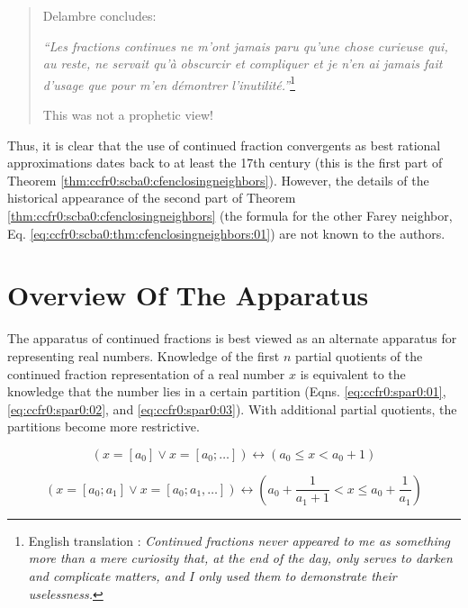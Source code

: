 \begin{quote}
Delambre concludes:

\emph{``Les fractions continues ne m'ont jamais paru qu'une chose
curieuse qui, au reste, ne servait qu'\`a obscurcir et compliquer et je
n'en ai jamais fait d'usage que pour m'en d\'emontrer 
l'inutilit\'e.''}\footnote{English translation 
\cite{bibref:i:sandrinederaspide}:  
\emph{Continued fractions never appeared to me as something more 
than a mere curiosity that, at the end of the day, only serves 
to darken and complicate matters, and I only used them to 
demonstrate their uselessness.}}

This was not a prophetic view!
\end{quote}

Thus, it is clear that the use of continued fraction convergents
as best rational approximations dates back to at least the 
17th century (this is the first part of
Theorem \ref{thm:ccfr0:scba0:cfenclosingneighbors}).  However,
the details of the historical appearance of the second part of
Theorem \ref{thm:ccfr0:scba0:cfenclosingneighbors} (the formula
for the other Farey neighbor, Eq. \ref{eq:ccfr0:scba0:thm:cfenclosingneighbors:01}) 
are not known to the authors.


\section{Overview Of The Apparatus}

The apparatus of continued fractions is best viewed as
an alternate apparatus for representing real numbers.
Knowledge of the first $n$ partial quotients of
the continued fraction representation of a real number
$x$ is equivalent to the knowledge that the number lies
in a certain partition (Eqns.  
\ref{eq:ccfr0:spar0:01},
\ref{eq:ccfr0:spar0:02}, and \ref{eq:ccfr0:spar0:03}).  With additional
partial quotients, the partitions become more restrictive.

\begin{equation}
\label{eq:ccfr0:spar0:01}
(x=[a_0] \vee x=[a_0; \ldots ] ) \leftrightarrow (a_0 \leq x < a_0 + 1)
\end{equation}

\begin{equation}
\label{eq:ccfr0:spar0:02}
(x=[a_0; a_1] \vee x=[a_0; a_1, \ldots ] ) \leftrightarrow
\left(
{
a_0 + \frac{1}{a_1 + 1} < x \leq a_0 + \frac{1}{a_1}
}
\right)
\end{equation}

